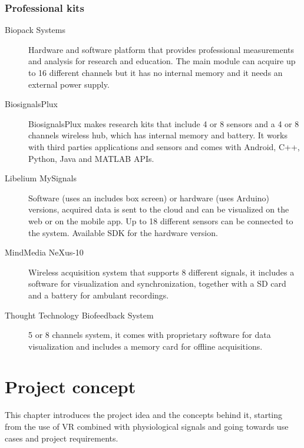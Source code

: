 \documentclass[binding=0.6cm,LaM]{sapthesis}
\begin{document}
\subsection{Professional kits}

\begin{description}

\item[Biopack Systems]
Hardware and software platform that provides professional measurements and analysis for research and education. The main module can acquire up to 16 different channels but it has no internal memory and it needs an external power supply.

\item[BiosignalsPlux]
BiosignalsPlux makes research kits that include 4 or 8 sensors and a 4 or 8 channels wireless hub, which has internal memory and battery. It works with third parties applications and sensors and comes with  Android, C++, Python, Java and MATLAB APIs.

\item[Libelium MySignals]
Software (uses an includes box screen) or hardware (uses Arduino) versions, acquired data is sent to the cloud and can be visualized on the web or on the mobile app. Up to 18 different sensors can be connected to the system. Available SDK for the hardware version.

\item[MindMedia NeXus-10]
Wireless acquisition system that supports 8 different signals, it includes a software for visualization and synchronization, together with a SD card and a battery for ambulant recordings.

\item[Thought Technology Biofeedback System]
5 or 8 channels system, it comes with proprietary software for data visualization and includes a memory card for offline acquisitions.

\end{description}






\chapter{Project concept}
This chapter introduces the project idea and the concepts behind it, starting from the use of VR combined with physiological signals and going towards use cases and project requirements.
\end{document}
